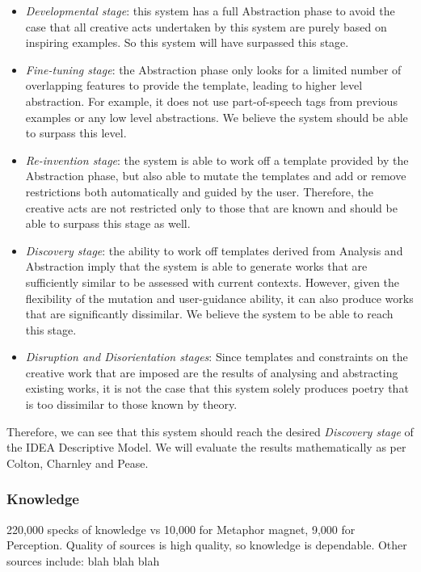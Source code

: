\begin{itemize}
\setlength{\itemsep}{0pt}
\item{\emph{Developmental stage}: this system has a full Abstraction phase to avoid the case that all creative acts undertaken by this system are purely based on inspiring examples. So this system will have surpassed this stage.}
\item{\emph{Fine-tuning stage}: the Abstraction phase only looks for a limited number of overlapping features to provide the template, leading to higher level abstraction. For example, it does not use part-of-speech tags from previous examples or any low level abstractions. We believe the system should be able to surpass this level.}
\item{\emph{Re-invention stage}: the system is able to work off a template provided by the Abstraction phase, but also able to mutate the templates and add or remove restrictions both automatically and guided by the user. Therefore, the creative acts are not restricted only to those that are known and should be able to surpass this stage as well.}
\item{\emph{Discovery stage}: the ability to work off templates derived from Analysis and Abstraction imply that the system is able to generate works that are sufficiently similar to be assessed with current contexts. However, given the flexibility of the mutation and user-guidance ability, it can also produce works that are significantly dissimilar. We believe the system to be able to reach this stage.}
\item{\emph{Disruption and Disorientation stages}: Since templates and constraints on the creative work that are imposed are the results of analysing and abstracting existing works, it is not the case that this system solely produces poetry that is too dissimilar to those known by theory. }
\end{itemize}

Therefore, we can see that this system should reach the desired \emph{Discovery stage} of the IDEA Descriptive Model. We will evaluate the results mathematically as per Colton, Charnley and Pease.

\subsubsection{Knowledge}
220,000 specks of knowledge vs 10,000 for Metaphor magnet, 9,000 for Perception.
Quality of sources is high quality, so knowledge is dependable.
Other sources include:
blah
blah
blah


